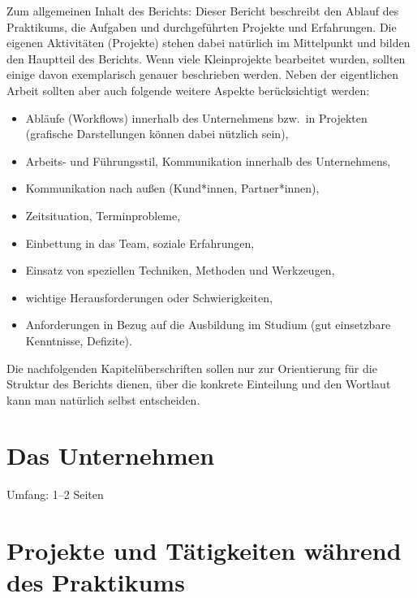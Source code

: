 \documentclass[type=internship,theme=default,language=german,titlelanguage=german,smartquotes=true,aiusage=detailed]{hgbthesis}
\begin{document}
Zum allgemeinen Inhalt des Berichts: Dieser Bericht beschreibt den Ablauf des
Praktikums, die Aufgaben und durchgeführten Projekte und Erfahrungen. Die
eigenen Aktivitäten (Projekte) stehen dabei natürlich im Mittelpunkt und bilden
den Hauptteil des Berichts. Wenn viele Kleinprojekte bearbeitet wurden, sollten
einige davon exemplarisch genauer beschrieben werden. Neben der eigentlichen
Arbeit sollten aber auch folgende weitere Aspekte berücksichtigt werden:
%
\begin{itemize}
	\item Abläufe (Workflows) innerhalb des Unternehmens bzw.\ in Projekten
	(grafische Darstellungen können dabei nützlich sein),
	\item Arbeits- und Führungsstil, Kommunikation innerhalb des Unternehmens,
	\item Kommunikation nach außen (Kund*innen, Partner*innen),
	\item Zeitsituation, Terminprobleme,
	\item Einbettung in das Team, soziale Erfahrungen,
	\item Einsatz von speziellen Techniken, Methoden und Werkzeugen,
	\item wichtige Herausforderungen oder Schwierigkeiten,
	\item Anforderungen in Bezug auf die Ausbildung im Studium (gut
	einsetzbare Kenntnisse, Defizite).
\end{itemize}
%
Die nachfolgenden Kapitelüberschriften sollen nur zur Orientierung für die
Struktur des Berichts dienen, über die konkrete Einteilung und den Wortlaut
kann man natürlich selbst entscheiden.

\mainmatter                             %

\chapter{Das Unternehmen}

Umfang: 1--2 Seiten


\chapter{Projekte und Tätigkeiten während des Praktikums}
\end{document}
